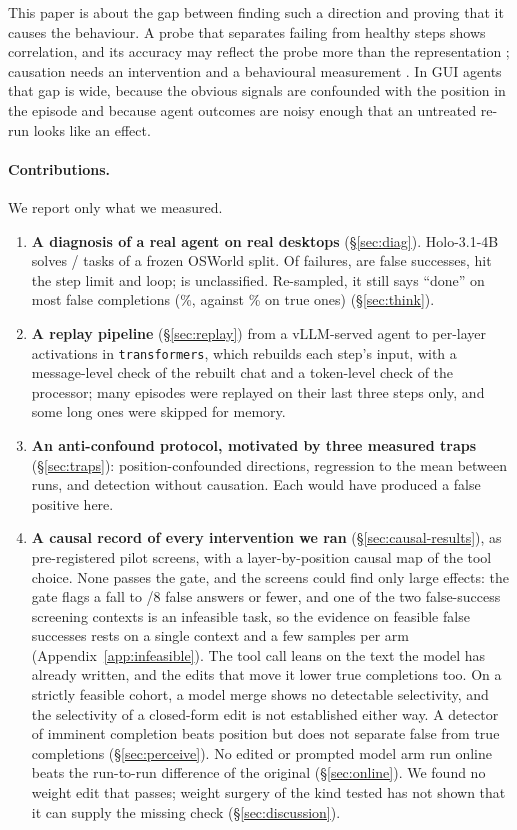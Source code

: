 This paper is about the gap between finding such a direction and proving that it causes the behaviour. A probe that separates failing from healthy steps shows correlation, and its accuracy may reflect the probe more than the representation \citep{hewitt2019control}; causation needs an intervention and a behavioural measurement \citep{belinkov2021probing}. In GUI agents that gap is wide, because the obvious signals are confounded with the position in the episode and because agent outcomes are noisy enough that an untreated re-run looks like an effect.

\paragraph{Contributions.} We report only what we measured.
\begin{enumerate}
\item \textbf{A diagnosis of a real agent on real desktops} (\S\ref{sec:diag}). Holo-3.1-4B solves \oswNSuccess/\oswNScored{} tasks of a frozen OSWorld split. Of \oswNFail{} failures, \oswCatFalseSuccess{} are false successes, \oswCatStepLimit{} hit the step limit and \oswCatLoop{} loop; \oswCatOther{} is unclassified. Re-sampled, it still says ``done'' on most false completions (\pwOrigFspPct\%, against \pwOrigFsmPct\% on true ones) (\S\ref{sec:think}).
\item \textbf{A replay pipeline} (\S\ref{sec:replay}) from a vLLM-served agent to per-layer activations in \texttt{transformers}, which rebuilds each step's input, with a message-level check of the rebuilt chat and a token-level check of the processor; many episodes were replayed on their last three steps only, and some long ones were skipped for memory.
\item \textbf{An anti-confound protocol, motivated by three measured traps} (\S\ref{sec:traps}): position-confounded directions, regression to the mean between runs, and detection without causation. Each would have produced a false positive here.
\item \textbf{A causal record of every intervention we ran} (\S\ref{sec:causal-results}), as pre-registered pilot screens, with a layer-by-position causal map of the tool choice. None passes the gate, and the screens could find only large effects: the gate flags a fall to \gateMaxAnswers/8 false answers or fewer, and one of the two false-success screening contexts is an infeasible task, so the evidence on feasible false successes rests on a single context and a few samples per arm (Appendix~\ref{app:infeasible}). The tool call leans on the text the model has already written, and the edits that move it lower true completions too. On a strictly feasible cohort, a model merge shows no detectable selectivity, and the selectivity of a closed-form edit is not established either way. A detector of imminent completion beats position but does not separate false from true completions (\S\ref{sec:perceive}). No edited or prompted model arm run online beats the run-to-run difference of the original (\S\ref{sec:online}). We found no weight edit that passes; weight surgery of the kind tested has not shown that it can supply the missing check (\S\ref{sec:discussion}).

\end{enumerate}
